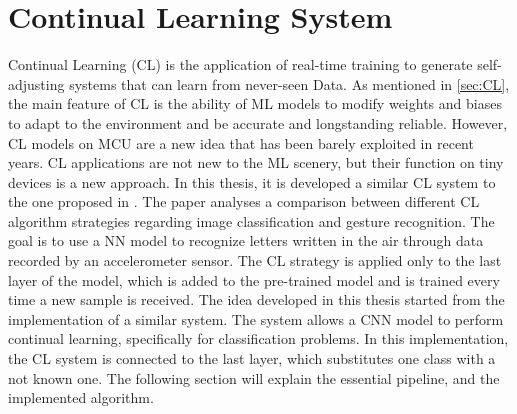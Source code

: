 \section{Continual Learning System}
\label{cha:cl_system}
\quad Continual Learning (CL) is the application of real-time training to generate self-adjusting systems that can learn from never-seen Data. As mentioned in \autoref{sec:CL}, the main feature of CL is the ability of ML models to modify weights and biases to adapt to the environment and be accurate and longstanding reliable. However, CL models on MCU are a new idea that has been barely exploited in recent years. CL applications are not new to the ML scenery, but their function on tiny devices is a new approach. In this thesis, it is developed a similar CL system to the one proposed in \cite{Comprarison_of_Continual_learning_algorithm}. The paper analyses a comparison between different CL algorithm strategies regarding image classification and gesture recognition. The goal is to use a NN model to recognize letters written in the air through data recorded by an accelerometer sensor. The CL strategy is applied only to the last layer of the model, which is added to the pre-trained model and is trained every time a new sample is received.
The idea developed in this thesis started from the implementation of a similar system. The system allows a CNN model to perform continual learning, specifically for classification problems. In this implementation, the CL system is connected to the last layer, which substitutes one class with a not known one. The following section will explain the essential pipeline, and the implemented algorithm.
 

